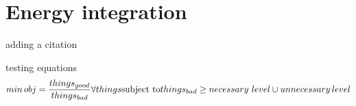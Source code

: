 \section{Energy integration}

adding a citation \cite{Pouransari_2014}

testing equations
\begin{equation}
min \, obj= \frac{things_{good}}{things_{bad}} \forall things\\
\text{subject to}  \\
things_{bad}\ge necessary\,\, level \cup unnecessary \, level
\end{equation}